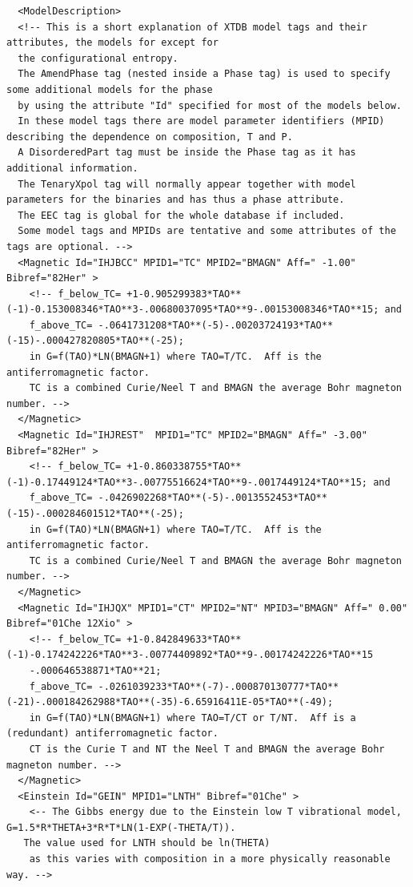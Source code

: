\documentclass{article}
\begin{document}
\begin{appendices}
{\small
\begin{verbatim}
  <ModelDescription>
  <!-- This is a short explanation of XTDB model tags and their attributes, the models for except for
  the configurational entropy.
  The AmendPhase tag (nested inside a Phase tag) is used to specify some additional models for the phase
  by using the attribute "Id" specified for most of the models below.
  In these model tags there are model parameter identifiers (MPID) describing the dependence on composition, T and P.
  A DisorderedPart tag must be inside the Phase tag as it has additional information.
  The TenaryXpol tag will normally appear together with model parameters for the binaries and has thus a phase attribute.
  The EEC tag is global for the whole database if included.
  Some model tags and MPIDs are tentative and some attributes of the tags are optional. -->
  <Magnetic Id="IHJBCC" MPID1="TC" MPID2="BMAGN" Aff=" -1.00" Bibref="82Her" > 
    <!-- f_below_TC= +1-0.905299383*TAO**(-1)-0.153008346*TAO**3-.00680037095*TAO**9-.00153008346*TAO**15; and
    f_above_TC= -.0641731208*TAO**(-5)-.00203724193*TAO**(-15)-.000427820805*TAO**(-25); 
    in G=f(TAO)*LN(BMAGN+1) where TAO=T/TC.  Aff is the antiferromagnetic factor.
    TC is a combined Curie/Neel T and BMAGN the average Bohr magneton number. -->
  </Magnetic>
  <Magnetic Id="IHJREST"  MPID1="TC" MPID2="BMAGN" Aff=" -3.00" Bibref="82Her" > 
    <!-- f_below_TC= +1-0.860338755*TAO**(-1)-0.17449124*TAO**3-.00775516624*TAO**9-.0017449124*TAO**15; and 
    f_above_TC= -.0426902268*TAO**(-5)-.0013552453*TAO**(-15)-.000284601512*TAO**(-25); 
    in G=f(TAO)*LN(BMAGN+1) where TAO=T/TC.  Aff is the antiferromagnetic factor.
    TC is a combined Curie/Neel T and BMAGN the average Bohr magneton number. -->
  </Magnetic>
  <Magnetic Id="IHJQX" MPID1="CT" MPID2="NT" MPID3="BMAGN" Aff=" 0.00" Bibref="01Che 12Xio" > 
    <!-- f_below_TC= +1-0.842849633*TAO**(-1)-0.174242226*TAO**3-.00774409892*TAO**9-.00174242226*TAO**15
    -.000646538871*TAO**21;
    f_above_TC= -.0261039233*TAO**(-7)-.000870130777*TAO**(-21)-.000184262988*TAO**(-35)-6.65916411E-05*TAO**(-49);
    in G=f(TAO)*LN(BMAGN+1) where TAO=T/CT or T/NT.  Aff is a (redundant) antiferromagnetic factor.
    CT is the Curie T and NT the Neel T and BMAGN the average Bohr magneton number. -->
  </Magnetic>
  <Einstein Id="GEIN" MPID1="LNTH" Bibref="01Che" > 
    <-- The Gibbs energy due to the Einstein low T vibrational model, G=1.5*R*THETA+3*R*T*LN(1-EXP(-THETA/T)).
   The value used for LNTH should be ln(THETA)
    as this varies with composition in a more physically reasonable way. -->

\end{verbatim}}
\end{appendices}
\end{document}
